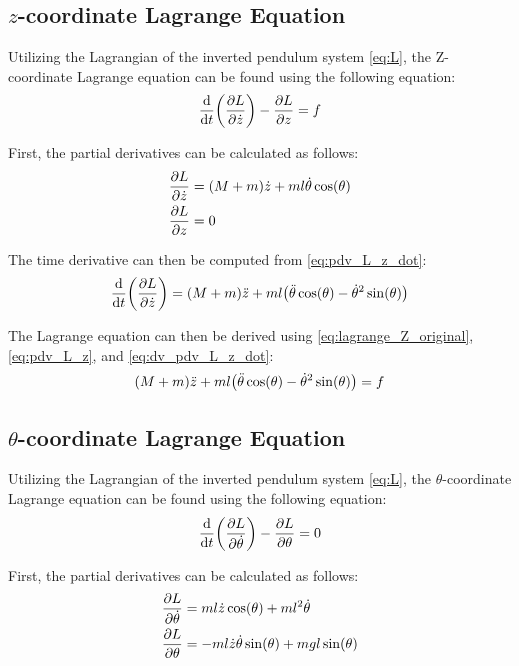 \documentclass[]{article}
\begin{document}
	\subsection{$z$-coordinate Lagrange Equation}
	
		Utilizing the Lagrangian of the inverted pendulum system \eqref{eq:L}, the Z-coordinate Lagrange equation can be found using the following equation:
		\begin{equation}
			\dv{t} \qty(\pdv{L}{\dot{z}}) - \pdv{L}{z} = f
			\label{eq:lagrange_Z_original}
		\end{equation}
		
		First, the partial derivatives can be calculated as follows:
		\begin{align}
			\pdv{L}{\dot{z}} &= (M+m)\dot{z} + m l \dot{\theta}\cos(\theta) \label{eq:pdv_L_z_dot}\\
			\pdv{L}{z} &= 0 \label{eq:pdv_L_z}
		\end{align}
		
		The time derivative can then be computed from \eqref{eq:pdv_L_z_dot}:
		\begin{equation}
			\dv{t} \qty(\pdv{L}{\dot{z}}) = (M+m)\ddot{z} + m l \qty(\ddot{\theta}\cos(\theta) - \dot{\theta}^2\sin(\theta))
			\label{eq:dv_pdv_L_z_dot}
		\end{equation}
		
		The Lagrange equation can then be derived using \eqref{eq:lagrange_Z_original}, \eqref{eq:pdv_L_z}, and \eqref{eq:dv_pdv_L_z_dot}:
		\begin{equation}
			(M+m)\ddot{z} + m l \qty(\ddot{\theta}\cos(\theta) - \dot{\theta}^2\sin(\theta)) = f
			\label{eq:lagrange_Z}
		\end{equation}
	
	\subsection{$\theta$-coordinate Lagrange Equation}
	
		Utilizing the Lagrangian of the inverted pendulum system \eqref{eq:L}, the $\theta$-coordinate Lagrange equation can be found using the following equation:
		\begin{equation}
			\dv{t} \qty(\pdv{L}{\dot{\theta}}) - \pdv{L}{\theta} = 0
			\label{eq:lagrange_theta_original}
		\end{equation}
		
		First, the partial derivatives can be calculated as follows:
		\begin{align}
			\pdv{L}{\dot{\theta}} &= m l \dot{z} \cos(\theta) + m l^2 \dot{\theta} \label{eq:pdv_L_theta_dot}\\
			\pdv{L}{\theta} &= - m l \dot{z} \dot{\theta} \sin(\theta) + m g l \sin(\theta) \label{eq:pdv_L_theta}
		\end{align}
		
\end{document}
